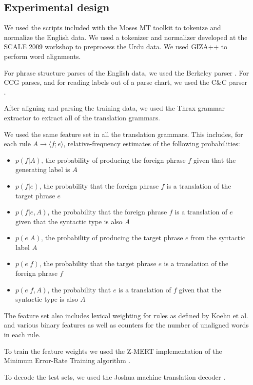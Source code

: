 \documentclass[a4paper]{article}
\begin{document}
\subsection{Experimental design}

We used the scripts included with the Moses MT toolkit \cite{moses} to tokenize and normalize the English data. We used a tokenizer and normalizer developed at the SCALE 2009 workshop \cite{scale09} to preprocess the Urdu data. We used GIZA++ \cite{giza} to perform word alignments.

For phrase structure parses of the English data, we used the Berkeley parser \cite{Petrov-Klein-Inference}. For CCG parses, and for reading labels out of a parse chart, we used the C\&C parser \cite{candc}.

After aligning and parsing the training data, we used the Thrax grammar extractor \cite{joshua3} to extract all of the translation grammars.

We used the same feature set in all the translation grammars. This includes, for each rule $A \to \langle f ; e \rangle$, relative-frequency estimates of the following probabilities:
\begin{itemize}
\item $p(f|A)$, the probability of producing the foreign phrase $f$ given that the generating label is $A$
\item $p(f|e)$, the probability that the foreign phrase $f$ is a translation of the target phrase $e$
\item $p(f|e,A)$, the probability that the foreign phrase $f$ is a translation of $e$ given that the syntactic type is also $A$
\item $p(e|A)$, the probability of producing the target phrase $e$ from the syntactic label $A$
\item $p(e|f)$, the probability that the target phrase $e$ is a translation of the foreign phrase $f$
\item $p(e|f,A)$, the probability that $e$ is a translation of $f$ given that the syntactic type is also $A$
\end{itemize}
The feature set also includes lexical weighting for rules as defined by Koehn et al.  and various binary features as well as counters for the number of unaligned words in each rule.

To train the feature weights we used the Z-MERT implementation \cite{zmert} of the Minimum Error-Rate Training algorithm \cite{mert}.

To decode the test sets, we used the Joshua machine translation decoder \cite{joshua3}.
\end{document}
